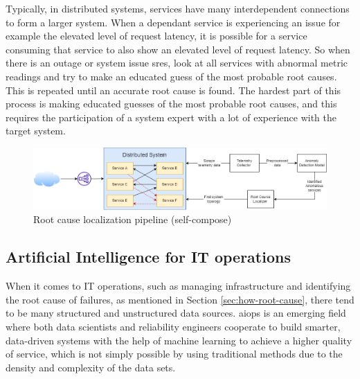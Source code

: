 Typically, in distributed systems, services have many interdependent connections to form a larger system. When a dependant service is experiencing an issue for example the elevated level of request latency, it is possible for a service consuming that service to also show an elevated level of request latency. So when there is an outage or system issue \acp{sre}, look at all services with abnormal metric readings and try to make an educated guess of the most probable root causes. This is repeated until an accurate root cause is found. The hardest part of this process is making educated guesses of the most probable root causes, and this requires the participation of a system expert with a lot of experience with the target system.

\begin{figure}[H]
    \includegraphics[width=16cm]{assets/literature-review/demo.png}
    \caption{Root cause localization pipeline (self-compose)}
\end{figure}

\subsection{Artificial Intelligence for IT operations}

When it comes to IT operations, such as managing infrastructure and identifying the root cause of failures, as mentioned in Section \ref{sec:how-root-cause}, there tend to be many structured and unstructured data sources. \ac{aiops} is an emerging field \citep{Artifici8:online} where both data scientists and reliability engineers cooperate to build smarter, data-driven systems with the help of machine learning to achieve a higher quality of service, which is not simply possible by using traditional methods due to the density and complexity of the data sets.

